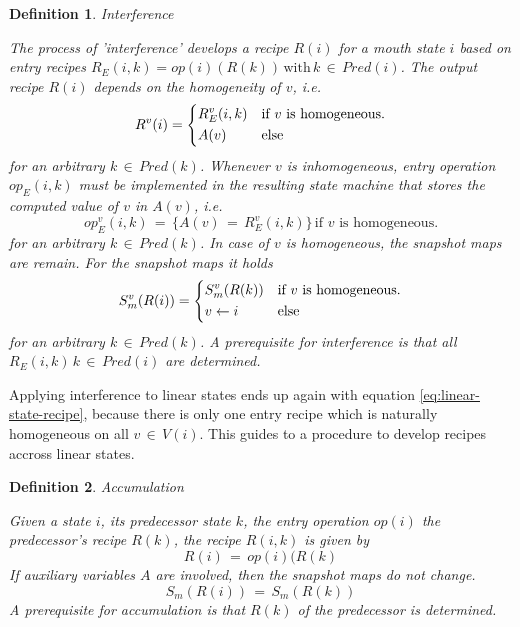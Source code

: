 \documentclass[12pt,a4paper]{scrartcl}
\newtheorem{definition}{Definition}
\begin{document}
\begin{definition} Interference

The process of 'interference' develops a recipe $R(i)$ for a mouth state $i$
based on entry recipes $R_E(i,k) = op(i)(R(k))\,\mbox{with}\,k\,\in\,Pred(i)$.
The output recipe $R(i)$ depends on the homogeneity of $v$, i.e. 
\begin{equation}
    R^v(i) = \begin{dcases*}
              R_E^v(i,k) & if $v$ is homogeneous.\\
              A(v)       & else
             \end{dcases*}
\end{equation}
for an arbitrary $k\,\in\,Pred(k)$. Whenever $v$ is inhomogeneous, entry
operation $op_E(i,k)$ must be implemented in the resulting state machine that
stores the computed value of $v$ in $A(v)$, i.e.
\begin{equation}
    op_E^v(i,k) \,=\, \{ A(v) \,=\, R^v_E(i,k) \} \,\mbox{if $v$ is homogeneous}.
\end{equation}
for an arbitrary $k\,\in\,Pred(k)$. In case of $v$ is homogeneous, the snapshot maps
are remain. For the snapshot maps it holds
\begin{equation}
    S^v_m(R(i)) = \begin{dcases*}
                  S^v_m(R(k))    & if $v$ is homogeneous.\\
                  v \leftarrow i & else
                  \end{dcases*}
\end{equation}
for an arbitrary $k\,\in\,Pred(k)$. A prerequisite for interference is that 
all $R_E(i,k)\,k\,\in\,Pred(i)$ are determined.
\end{definition}

Applying interference to linear states ends up again with equation 
\eqref{eq:linear-state-recipe}, because there is only one entry recipe
which is naturally homogeneous on all $v\,\in\,V(i)$. This guides to 
a procedure to develop recipes accross linear states.

\begin{definition} Accumulation

Given a state $i$, its predecessor state $k$, the entry operation $op(i)$
the predecessor's recipe $R(k)$, the recipe $R(i,k)$ is given by
\begin{equation}
       R(i)\,=\,op(i)(R(k)
\end{equation}
If auxiliary variables $A$ are involved, then the snapshot maps do not change. 
\begin{equation} \label{eq:accumulation-aux}
    S_m(R(i))\,=\,S_m(R(k))
\end{equation}
A prerequisite for accumulation is that $R(k)$ of the predecessor is 
determined.
\end{definition}
\end{document}
